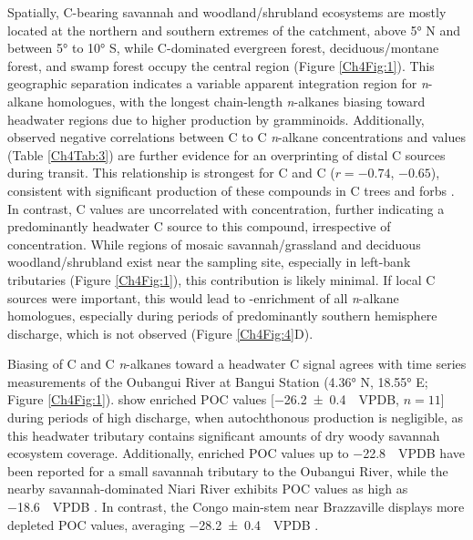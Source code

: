 Spatially, C-bearing savannah and woodland/shrubland ecosystems are mostly located at the northern and southern extremes of the catchment, above \ang{5} N and between \ang{5} to \ang{10} S, while C-dominated evergreen forest, deciduous/montane forest, and swamp forest occupy the central region (Figure \ref{Ch4Fig:1}). This geographic separation indicates a variable apparent integration region for \textit{n}-alkane homologues, with the longest chain-length \textit{n}-alkanes biasing toward headwater regions due to higher production by gramminoids. Additionally, observed negative correlations between C to C \textit{n}-alkane concentrations and  values (Table \ref{Ch4Tab:3}) are further evidence for an overprinting of distal C sources during transit. This relationship is strongest for C and C ($r = -0.74$, $-0.65$), consistent with significant production of these compounds in C trees and forbs \citep{Rommerskirchen:2006gr,Vogts:2009fb}. In contrast, C  values are uncorrelated with concentration, further indicating a predominantly headwater C source to this compound, irrespective of concentration. While regions of mosaic savannah/grassland and deciduous woodland/shrubland exist near the sampling site, especially in left-bank tributaries (Figure \ref{Ch4Fig:1}), this contribution is likely minimal. If local C sources were important, this would lead to -enrichment of all \textit{n}-alkane homologues, especially during periods of predominantly southern hemisphere discharge, which is not observed (Figure \ref{Ch4Fig:4}D).

Biasing of C and C \textit{n}-alkanes toward a headwater C signal agrees with time series measurements of the Oubangui River at Bangui Station (\ang{4.36} N, \ang{18.55} E; Figure \ref{Ch4Fig:1}). \citet{Bouillon:2012cw} show enriched POC  values [\SI{-26.2 \pm 0.4}{\permil.VPDB}, $n = 11$] during periods of high discharge, when autochthonous production is negligible, as this headwater tributary contains significant amounts of dry woody savannah ecosystem coverage. Additionally, enriched POC  values up to \SI{-22.8}{\permil.VPDB} have been reported for a small savannah tributary to the Oubangui River, while the nearby savannah-dominated Niari River exhibits POC  values as high as \SI{-18.6}{\permil.VPDB} \citep{Mariotti:1991vx,Bouillon:2014ko}. In contrast, the Congo main-stem near Brazzaville displays more depleted POC  values, averaging \SI{-28.2 \pm 0.4}{\permil.VPDB} \citep[$n = 5$;][]{Spencer:2012en}.

